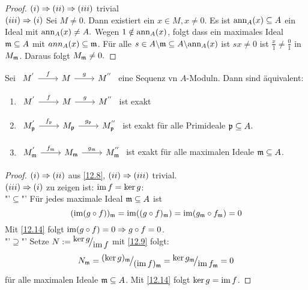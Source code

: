 \begin{proof}
	$(i) \Rightarrow (ii) \Rightarrow (iii) $ trivial \\
	$(iii) \Rightarrow (i) $ Sei $M \neq 0.$ Dann existiert ein $x\in M, x\neq 0.$ Es ist $\text{ann}_{A}(x) \subseteq A $ ein Ideal mit $\text{ann}_{A}(x )\neq A.$ Wegen $1 \notin \text{ann}_A(x)$, folgt dass ein maximales Ideal $\mathfrak{m} \subseteq A $ mit $ann_A(x)\subseteq \mathfrak{m} $. Für alle $s \in A\backslash \mathfrak{m} \subseteq A \backslash \text{ann}_A(x) $ ist $sx \neq 0$ ist $ \frac{x}{1} \neq \frac{0}{1} $ in $M_{\mathfrak{m}} $. Daraus folgt $M_{\mathfrak{m}} \neq 0. $
\end{proof}
\begin{fo} \label{12.15}
	Sei  $\begin{tikzcd}
	 M^{'} \arrow{r}{f} & M \arrow{r}{g} & M^{''} 
	\end{tikzcd}$ eine Sequenz vn $A$-Moduln. Dann sind äquivalent: 
	\begin{enumerate} [label= \roman*)]
		\item $\begin{tikzcd} M^{'} \arrow{r}{f} & M \arrow{r}{g} & M^{''} \end{tikzcd}$ ist exakt 
		\item $\begin{tikzcd} M_{\p}^{'} \arrow{r}{f_{\p}} & M_{\p} \arrow{r}{g_{\p}} & M_{\p}^{''}  \end{tikzcd}$ ist exakt für alle Primideale $\mathfrak{p} \subseteq A$. 
		\item $\begin{tikzcd} M_{\m}^{'} \arrow{r}{f_{\m}} & M_{\m} \arrow{r}{g_{\m}} & M_{\m}^{''}  \end{tikzcd}$ ist exakt für alle maximalen Ideale $\mathfrak{m} \subseteq A$.
	\end{enumerate}
\end{fo}
\begin{proof}
	$(i) \Rightarrow (ii) $ aus \ref{12.8}, $(ii) \Rightarrow (iii)$ trivial. \\
	$(iii) \Rightarrow (i) $ zu zeigen ist: $ \operatorname{im} f = \ker g $: \\
	"'$\subseteq$"' Für jedes maximale Ideal $\mathfrak{m} \subseteq A $ ist $$(\operatorname{im} (g \circ f))_{\mathfrak{m}} = \operatorname{im}((g \circ f)_{\mathfrak{m}}) = \operatorname{im} (g_{\mathfrak{m}} \circ f_{\mathfrak{m}}) = 0$$ Mit \ref{12.14} folgt $\operatorname{im}(g \circ f) = 0 \Rightarrow g \circ f = 0$. \\
	"'$\supseteq$"' Setze $ N := \QR{\ker g }{\im f} $ mit \ref{12.9} folgt: $$N_{\m} = \QR{(\ker g)_{\m} }{(\im f)_{\m}} = \QR{\ker g_{\m} }{\im f_{\m}} = 0 $$ für alle maximalen Ideale $\mathfrak{m} \subseteq A$. Mit \ref{12.14} folgt $\ker g = \operatorname{im} f $.
\end{proof}
